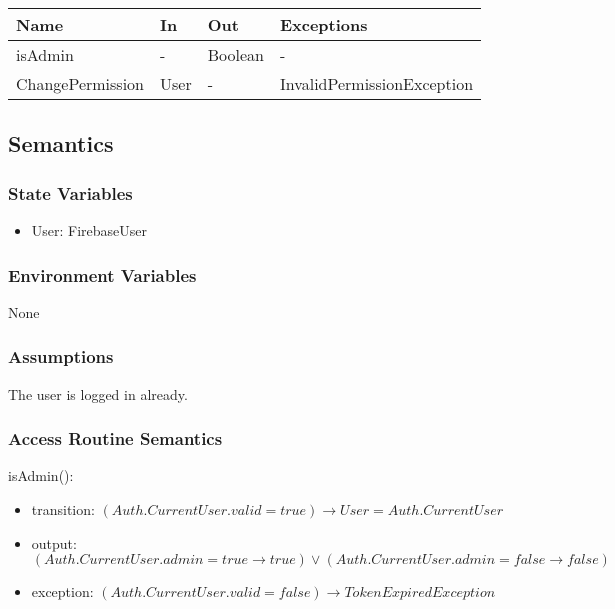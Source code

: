 \documentclass[12pt, titlepage]{article}
\begin{document}
\begin{center}
	\begin{tabular}{p{4cm} p{2cm} p{4cm} p{4cm}}
	\hline
	\textbf{Name} & \textbf{In} & \textbf{Out} & \textbf{Exceptions} \\
	\hline
	isAdmin & - & Boolean & - \\
	ChangePermission & User & - & InvalidPermissionException \\
	\hline
	\end{tabular}
\end{center}

\subsection{Semantics}

\subsubsection{State Variables}

\begin{itemize}
\item User: FirebaseUser
\end{itemize}

\subsubsection{Environment Variables}

None

\subsubsection{Assumptions}

The user is logged in already.

\subsubsection{Access Routine Semantics}

\noindent isAdmin():
\begin{itemize}
\item transition: $(Auth.CurrentUser.valid = true) \rightarrow User = Auth.CurrentUser$ 
\item output: $(Auth.CurrentUser.admin = true \rightarrow true) \lor (Auth.CurrentUser.admin = false \rightarrow false)$
\item exception: $(Auth.CurrentUser.valid = false) \rightarrow TokenExpiredException$
\end{itemize}
\end{document}
